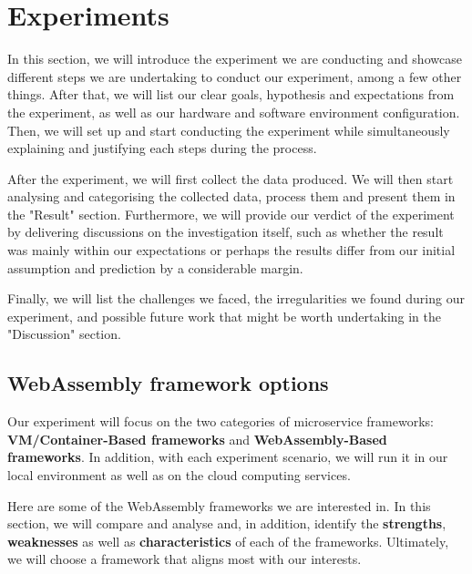 \chapter{Experiments} \label{chap:experiments}

In this section, we will introduce the experiment we are conducting and showcase different steps we are undertaking to conduct our experiment, among a few other things. After that, we will list our clear goals, hypothesis and expectations from the experiment, as well as our hardware and software environment configuration. Then, we will set up and start conducting the experiment while simultaneously explaining and justifying each steps during the process.

After the experiment, we will first collect the data produced. We will then start analysing and categorising the collected data, process them and present them in the "Result" section. Furthermore, we will provide our verdict of the experiment by delivering discussions on the investigation itself, such as whether the result was mainly within our expectations or perhaps the results differ from our initial assumption and prediction by a considerable margin.

Finally, we will list the challenges we faced, the irregularities we found during our experiment, and possible future work that might be worth undertaking in the "Discussion" section.

\bigskip
\section{WebAssembly framework options}

Our experiment will focus on the two categories of microservice frameworks: \textbf{VM/Container-Based frameworks} and \textbf{WebAssembly-Based frameworks}. In addition, with each experiment scenario, we will run it in our local environment as well as on the cloud computing services.

Here are some of the WebAssembly frameworks we are interested in. In this section, we will compare and analyse and, in addition, identify the \textbf{strengths}, \textbf{weaknesses} as well as \textbf{characteristics} of each of the frameworks. Ultimately, we will choose a framework that aligns most with our interests.

